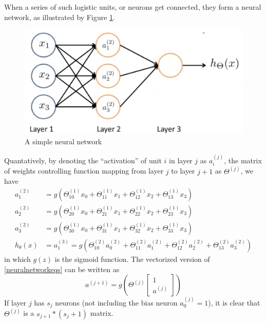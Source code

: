 When a series of such logistic units, or neurons get connected, they form a neural network, as illustrated by Figure 
\ref{neuralnetwork}.

\begin{figure}[ht]
\centering
\includegraphics[width =0.8 \textwidth]{neuralnetwork.jpg}
\caption{A simple neural network}\label{neuralnetwork}
\end{figure}

Quantatively, by denoting the ``activation'' of unit $i$ in layer $j$ as $a_i^{(j)}$, the matrix of weights controlling function mapping from layer  $j$ to layer $j+1$ as $\Theta^{(j)}$, we have
\begin{equation}
\begin{split}\label{neuralnetworkeqs}
a_1^{(2)} &= g\left(\Theta^{(1)}_{10}x_0 + \Theta^{(1)}_{11}x_1 + \Theta^{(1)}_{12}x_2 + \Theta^{(1)}_{13}x_3\right)\\
a_2^{(2)} &= g\left(\Theta^{(1)}_{20}x_0 + \Theta^{(1)}_{21}x_1 + \Theta^{(1)}_{22}x_2 + \Theta^{(1)}_{23}x_3\right)\\
a_3^{(2)} &= g\left(\Theta^{(1)}_{30}x_0 + \Theta^{(1)}_{31}x_1 + \Theta^{(1)}_{32}x_2 + \Theta^{(1)}_{33}x_3\right)\\
h_{\theta}(x) &= a_1^{(3)} = g\left(\Theta^{(2)}_{10}a_0^{(2)} + \Theta^{(2)}_{11}a_1^{(2)} + \Theta^{(2)}_{12}a_2^{(2)} + \Theta^{(2)}_{13}a_3^{(2)}\right)
\end{split}
\end{equation}
in which $g(z)$ is the sigmoid function. The vectorized version of \eqref{neuralnetworkeqs} can be written as 
\begin{equation}
a^{(j+1)} = g\left(\Theta^{(j)}
\begin{bmatrix}
1\\
a^{(j)}
\end{bmatrix}
\right)
\end{equation}
If layer $j$ has $s_j$ neurons (not including the bias neuron $a_0^{(j)}=1$), it is clear that $\Theta^{(j)}$ is a 
$s_{j+1} * (s_j + 1)$ matrix.
